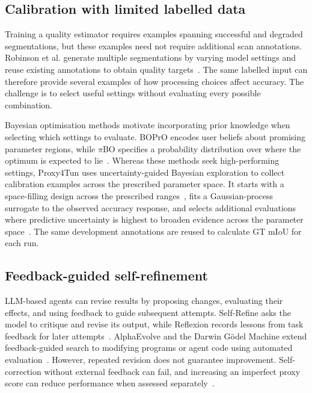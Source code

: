 \documentclass[a4paper,fleqn]{cas-dc}
\begin{document}
\subsection{Calibration with limited labelled data}

Training a quality estimator requires examples spanning successful and degraded segmentations, but these examples need not require additional scan annotations. Robinson et al. generate multiple segmentations by varying model settings and reuse existing annotations to obtain quality targets~\cite{robinson2018segmentationQuality}. The same labelled input can therefore provide several examples of how processing choices affect accuracy. The challenge is to select useful settings without evaluating every possible combination.

Bayesian optimisation methods motivate incorporating prior knowledge when selecting which settings to evaluate. BOPrO encodes user beliefs about promising parameter regions, while $\pi$BO specifies a probability distribution over where the optimum is expected to lie~\cite{souza2020prior,hvarfner2022pibo}. Whereas these methods seek high-performing settings, Proxy4Tun uses uncertainty-guided Bayesian exploration to collect calibration examples across the prescribed parameter space. It starts with a space-filling design across the prescribed ranges~\cite{joe2008constructing}, fits a Gaussian-process surrogate to the observed accuracy response, and selects additional evaluations where predictive uncertainty is highest to broaden evidence across the parameter space~\cite{gramacy2009adaptive,gramacy2020surrogates}. The same development annotations are reused to calculate GT mIoU for each run.

\subsection{Feedback-guided self-refinement}

LLM-based agents can revise results by proposing changes, evaluating their effects, and using feedback to guide subsequent attempts. Self-Refine asks the model to critique and revise its output, while Reflexion records lessons from task feedback for later attempts~\cite{madaan2023selfrefine,shinn2023reflexion}. AlphaEvolve and the Darwin G\"odel Machine extend feedback-guided search to modifying programs or agent code using automated evaluation~\cite{novikov2025alphaevolve,zhang2025darwin}. However, repeated revision does not guarantee improvement. Self-correction without external feedback can fail, and increasing an imperfect proxy score can reduce performance when assessed separately~\cite{huang2024selfcorrect,gao2023overoptimization}.
\end{document}
